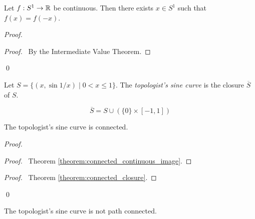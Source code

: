 \begin{proposition}
    Let $f : S^1 \rightarrow \mathbb{R}$ be continuous. Then there exists $x \in S^1$ such that $f(x) = f(-x)$.
\end{proposition}

\begin{proof}
    \pf
    \begin{proof}
        \pf\ By the Intermediate Value Theorem.
    \end{proof}
    \qed
\end{proof}

\begin{definition}
    Let $S = \{ (x, \sin 1/x) \mid 0 < x \leq 1 \}$. The \emph{topologist's sine curve} is the closure $\overline{S}$ of $S$.
\end{definition}

\begin{proposition}
    \[ \overline{S} = S \cup (\{0\} \times [-1,1]) \]
\end{proposition}
\begin{proposition}
    The topologist's sine curve is connected.
\end{proposition}

\begin{proof}
    \pf
    \begin{proof}
        \pf\ Theorem \ref{theorem:connected_continuous_image}.
    \end{proof}
    \begin{proof}
        \pf\ Theorem \ref{theorem:connected_closure}.
    \end{proof}
    \qed
\end{proof}

\begin{proposition}[CC]
    The topologist's sine curve is not path connected.
\end{proposition}

